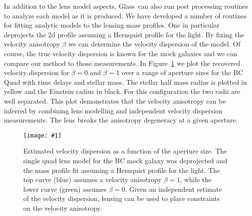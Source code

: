 \documentclass[galley]{mn2e}
\newcommand{\Glass}{{\sc Glass}}
\newcommand{\figref}[1] {Figure~\ref{#1}}
\newcommand\plotone[1]{%
 \centering
 \leavevmode
 \texttt{[image: \#1]}%
}%
\begin{document}
In addition to the lens model aspects, \Glass\ can also run post processing
routines to analyze each model as it is produced. We have developed a number of
routines for fitting analytic models to the lensing mass profiles. One in
particular deprojects the 2d profile assuming a Hernquist profile for the
light. By fixing the velocity anisotropy $\beta$ we can determine the velocity
dispersion of the model. Of course, the true velocity dispersion is known for
the mock galaxies and we can compare our method to those measurements.  In
\figref{sigma-beta} we plot the recovered velocity dispersion for $\beta=0$ and $\beta=1$
over a range of aperture sizes for the BC Quad with time delays and stellar
mass. The stellar half mass radius is plotted in yellow and the Einstein radius
in black. For this configuration the two radii are well separated. This plot
demonstrates that the velocity anisotropy can be inferred by combining lens
modelling and independent velocity dispersion measurements. The lens breaks
the anisotropy degeneracy at a given aperture.

\begin{figure}
\plotone{BCQuadR1a_TmS-sb.pdf}
\caption{Estimated velocity dispersion as a function of the aperture size. The
single quad lens model for the BC mock galaxy was deprojected and the mass
profile fit assuming a Hernquist profile for the light. The top curve (blue)
assumes a velocity anisotropy $\beta=1$, while the lower curve (green)
assumes $\beta=0$. Given an independent estimate of the velocity dispersion,
lensing can be used to place constraints on the velocity anisotropy.}
\label{sigma-beta}
\end{figure}

%
\end{document}
